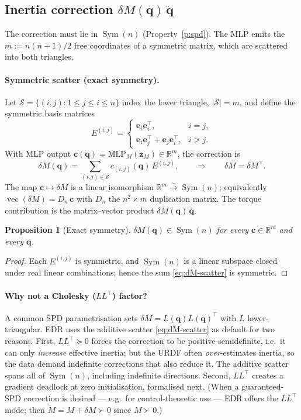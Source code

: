 \documentclass[11pt]{article}
\newcommand{\R}{\mathbb{R}}
\newcommand{\q}{\bm{q}}
\newcommand{\qdd}{\ddot{\bm{q}}}
\newcommand{\dM}{\delta\!M}
\newcommand{\MLP}{\mathrm{MLP}}
\newcommand{\Mmat}{M}
\newcommand{\Mt}{\tilde{M}}
\newcommand{\abs}[1]{\left\lvert #1 \right\rvert}
\newcommand{\transp}{^{\top}}
\DeclareMathOperator{\vecop}{vec}
\DeclareMathOperator{\Symop}{Sym}
\theoremstyle{definition}
\theoremstyle{plain}
\newtheorem{proposition}{Proposition}
\begin{document}
\subsection{Inertia correction \texorpdfstring{$\dM(\q)\,\qdd$}{dM(q) qddot}}
\label{sec:inertia}
The correction must lie in $\Symop(n)$ (Property~\ref{p:spd}). The MLP emits the
$m:=n(n+1)/2$ free coordinates of a symmetric matrix, which are scattered into
both triangles.

\paragraph{Symmetric scatter (exact symmetry).}
Let $\mathcal S=\{(i,j):1\le j\le i\le n\}$ index the lower triangle,
$\abs{\mathcal S}=m$, and define the symmetric basis matrices
\begin{equation}
E^{(i,j)}=
\begin{cases}
\bm e_i\bm e_i\transp, & i=j,\\[2pt]
\bm e_i\bm e_j\transp+\bm e_j\bm e_i\transp, & i>j.
\end{cases}
\end{equation}
With MLP output $\bm c(\q)=\MLP_M(\bm z_M)\in\R^{m}$, the correction is
\begin{equation}
\dM(\q)=\sum_{(i,j)\in\mathcal S}c_{(i,j)}(\q)\,E^{(i,j)},
\qquad\Longrightarrow\qquad \dM=\dM\transp.
\label{eq:dM-scatter}
\end{equation}
The map $\bm c\mapsto\dM$ is a linear isomorphism $\R^m\xrightarrow{\sim}\Symop(n)$;
equivalently $\vecop(\dM)=D_n\,\bm c$ with $D_n$ the $n^2\times m$ duplication
matrix. The torque contribution is the matrix--vector product $\dM(\q)\,\qdd$.

\begin{proposition}[Exact symmetry]\label{prop:sym}
$\dM(\q)\in\Symop(n)$ for every $\bm c\in\R^m$ and every $\q$.
\end{proposition}
\begin{proof}
Each $E^{(i,j)}$ is symmetric, and $\Symop(n)$ is a linear subspace closed under
real linear combinations; hence the sum \eqref{eq:dM-scatter} is symmetric.
\end{proof}

\paragraph{Why not a Cholesky ($LL\transp$) factor?}
A common SPD parametrisation sets $\dM=L(\q)L(\q)\transp$ with $L$
lower-triangular. EDR uses the additive scatter \eqref{eq:dM-scatter} as default
for two reasons. First, $LL\transp\succeq0$ forces the correction to be
positive-semidefinite, i.e.\ it can only \emph{increase} effective inertia; but
the URDF often \emph{over}-estimates inertia, so the data demand indefinite
corrections that also reduce it. The additive scatter spans all of $\Symop(n)$,
including indefinite directions. Second, $LL\transp$ creates a gradient deadlock
at zero initialisation, formalised next. (When a guaranteed-SPD correction is
desired --- e.g.\ for control-theoretic use --- EDR offers the $LL\transp$ mode;
then $\Mt=\Mmat+\dM\succ0$ since $\Mmat\succ0$.)
\end{document}
